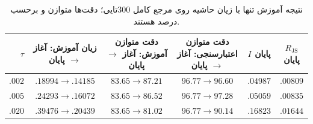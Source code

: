\begin{table}[htbp]
\centering\small
\caption{نتیجه آموزش تنها با زیان حاشیه روی مرجع کامل $300$تایی؛ دقت‌ها متوازن و برحسب درصد هستند.}
\label{tab:ch4-sigmoid-direct-training-300}
\begin{tabular}{rccccc}\hline
$\tau$ & زیان آموزش: آغاز $\to$ پایان & دقت متوازن آموزش: آغاز $\to$ پایان & دقت متوازن اعتبارسنجی: آغاز $\to$ پایان & $I$ پایان & $R_{\mathrm{JS}}$ پایان\\\hline
$.002$ & $.18994\to.14185$ & $83.65\to87.21$ & $96.77\to96.60$ & $.04987$ & $.00809$\\
$.005$ & $.24293\to.16072$ & $83.65\to86.52$ & $96.77\to97.28$ & $.05059$ & $.00835$\\
$.020$ & $.39476\to.20439$ & $83.65\to81.02$ & $96.77\to90.14$ & $.16823$ & $.01644$\\\hline
\end{tabular}
\end{table}
